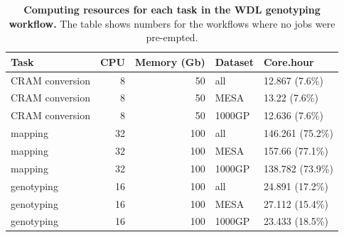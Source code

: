 \documentclass[11pt]{ucscthesis}
\begin{document}
\begin{table}[H]
  \centering
  \begin{tabular}[t]{|l|r|r|l|l|}
    \hline
    Task            & CPU & Memory (Gb) & Dataset & Core.hour        \\
    \hline
    CRAM conversion & 8   & 50          & all     & 12.867 (7.6\%)   \\
    CRAM conversion & 8   & 50          & MESA    & 13.22 (7.6\%)    \\
    CRAM conversion & 8   & 50          & 1000GP  & 12.636 (7.6\%)   \\
    \hline
    mapping         & 32  & 100         & all     & 146.261 (75.2\%) \\
    mapping         & 32  & 100         & MESA    & 157.66 (77.1\%)  \\
    mapping         & 32  & 100         & 1000GP  & 138.782 (73.9\%) \\
    \hline
    genotyping      & 16  & 100         & all     & 24.891 (17.2\%)  \\
    genotyping      & 16  & 100         & MESA    & 27.112 (15.4\%)  \\
    genotyping      & 16  & 100         & 1000GP  & 23.433 (18.5\%)  \\
    \hline
  \end{tabular}
  \caption[Computing resources for each task in the WDL genotyping workflow]{{\bf Computing resources for each task in the WDL genotyping workflow.}
    The table shows numbers for the workflows where no jobs were pre-empted.}
  \label{tab:svwdl-task}
\end{table}
\end{document}
